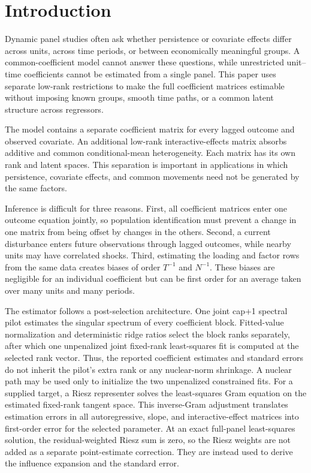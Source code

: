 \documentclass[11pt]{article}
\numberwithin{equation}{section}
\theoremstyle{remark}
\begin{document}
\clearpage
\tableofcontents
\clearpage

\section{Introduction}
\label{sec:introduction}

Dynamic panel studies often ask whether persistence or covariate effects differ across units, across time periods, or between economically meaningful groups. A common-coefficient model cannot answer these questions, while unrestricted unit--time coefficients cannot be estimated from a single panel. This paper uses separate low-rank restrictions to make the full coefficient matrices estimable without imposing known groups, smooth time paths, or a common latent structure across regressors.

The model contains a separate coefficient matrix for every lagged outcome and observed covariate. An additional low-rank interactive-effects matrix absorbs additive and common conditional-mean heterogeneity. Each matrix has its own rank and latent spaces. This separation is important in applications in which persistence, covariate effects, and common movements need not be generated by the same factors.

Inference is difficult for three reasons. First, all coefficient matrices enter one outcome equation jointly, so population identification must prevent a change in one matrix from being offset by changes in the others. Second, a current disturbance enters future observations through lagged outcomes, while nearby units may have correlated shocks. Third, estimating the loading and factor rows from the same data creates biases of order $T^{-1}$ and $N^{-1}$. These biases are negligible for an individual coefficient but can be first order for an average taken over many units and many periods.

The estimator follows a post-selection architecture. One joint cap+1 spectral pilot estimates the singular spectrum of every coefficient block. Fitted-value normalization and deterministic ridge ratios select the block ranks separately, after which one unpenalized joint fixed-rank least-squares fit is computed at the selected rank vector. Thus, the reported coefficient estimates and standard errors do not inherit the pilot's extra rank or any nuclear-norm shrinkage. A nuclear path may be used only to initialize the two unpenalized constrained fits. For a supplied target, a Riesz representer solves the least-squares Gram equation on the estimated fixed-rank tangent space. This inverse-Gram adjustment translates estimation errors in all autoregressive, slope, and interactive-effect matrices into first-order error for the selected parameter. At an exact full-panel least-squares solution, the residual-weighted Riesz sum is zero, so the Riesz weights are not added as a separate point-estimate correction. They are instead used to derive the influence expansion and the standard error.
\end{document}
